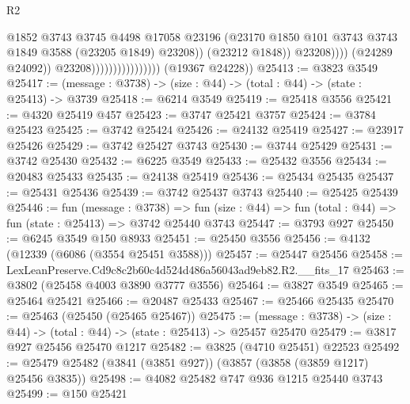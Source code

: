 \begin{lexlean}{R2}
\begin{coremodule}
                                                    @1852
                                                    @3743
                                                    @3745
                                                    @4498
                                                    @17058
                                                    @23196
                                                    (@23170
                                                      @1850
                                                      @101
                                                      @3743
                                                      @3743
                                                      @1849
                                                      @3588
                                                      (@23205 @1849)
                                                      @23208))
                                                  (@23212 @1848))
                                                @23208))))
                                        (@24289 @24092))
                                      @23208))))))))))))))))
      (@19367 @24228))
@25413 := @3823 @3549
@25417 := (message : @3738) -> (size : @44) -> (total : @44) -> (state : @25413) -> @3739
@25418 := @6214 @3549
@25419 := @25418 @3556
@25421 := @4320 @25419 @457
@25423 := @3747 @25421 @3757
@25424 := @3784 @25423
@25425 := @3742 @25424
@25426 := @24132 @25419
@25427 := @23917 @25426
@25429 := @3742 @25427 @3743
@25430 := @3744 @25429
@25431 := @3742 @25430
@25432 := @6225 @3549
@25433 := @25432 @3556
@25434 := @20483 @25433
@25435 := @24138 @25419
@25436 := @25434 @25435
@25437 := @25431 @25436
@25439 := @3742 @25437 @3743
@25440 := @25425 @25439
@25446 := fun (message : @3738) =>
  fun (size : @44) => fun (total : @44) => fun (state : @25413) => @3742 @25440 @3743
@25447 := @3793 @927
@25450 := @6245 @3549 @150 @8933
@25451 := @25450 @3556
@25456 := @4132 (@12339 (@6086 (@3554 @25451 @3588)))
@25457 := @25447 @25456
@25458 := LexLeanPreserve.Cd9c8c2b60c4d524d486a56043ad9eb82.R2.__fits_17
@25463 := @3802 (@25458 @4003 @3890 @3777 @3556)
@25464 := @3827 @3549
@25465 := @25464 @25421
@25466 := @20487 @25433
@25467 := @25466 @25435
@25470 := @25463 (@25450 (@25465 @25467))
@25475 := (message : @3738) -> (size : @44) -> (total : @44) -> (state : @25413) -> @25457 @25470
@25479 := @3817 @927 @25456 @25470 @1217
@25482 := @3825 (@4710 @25451) @22523
@25492 := @25479 @25482 (@3841 (@3851 @927)) (@3857 (@3858 (@3859 @1217) @25456 @3835))
@25498 := @4082 @25482 @747 @936 @1215 @25440 @3743
@25499 := @150 @25421

\end{coremodule}
\end{lexlean}
